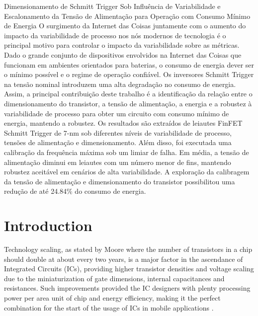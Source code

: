 \documentclass[pgmicro,mestrado,english]{iiufrgs}
\begin{document}
\begin{englishabstract}
{
Dimensionamento de Schmitt Trigger Sob Influência de Variabilidade e Escalonamento da Tensão de Alimentação para Operação com Consumo Mínimo de Energia
}
{
O surgimento da Internet das Coisas juntamente com o aumento do impacto da variabilidade de processo nos nós modernos de tecnologia é o principal motivo para controlar o impacto da variabilidade sobre as métricas. Dado o grande conjunto de dispositivos envolvidos na Internet das Coisas que funcionam em ambientes orientados para baterias, o consumo de energia dever ser o mínimo possível e o regime de operação confiável. Os inversores Schmitt Trigger na tensão nominal introduzem uma alta degradação no consumo de energia. Assim, a principal contribuição deste trabalho é a identificação da relação entre o dimensionamento do transistor, a tensão de alimentação, a energia e a robustez à variabilidade de processo para obter um circuito com consumo mínimo de energia, mantendo a robustez. Os resultados são extraídos de leiautes FinFET Schmitt Trigger de 7-nm sob diferentes níveis de variabilidade de processo, tensões de alimentação e dimensionamento. Além disso, foi executada uma calibração da frequência máxima sob um limiar de falha. Em média, a tensão de alimentação diminui em leiautes com um número menor de fins, mantendo robustez aceitável em cenários de alta variabilidade. A exploração da calibragem da tensão de alimentação e dimensionamento do transistor possibilitou uma redução de até 24.84\% do consumo de energia.
}
\end{englishabstract}

\tableofcontents

\chapter{Introduction}

	
	Technology scaling, as stated by Moore where the number of transistors in a chip should double at about every two years, is a major factor in the ascendance of Integrated Circuits (ICs), providing higher transistor densities and voltage scaling due to the miniaturization of gate dimensions, internal capacitances and resistances. Such improvements provided the IC designers with plenty processing power per area unit of chip and energy efficiency, making it the perfect combination for the start of the usage of ICs in mobile applications \cite{islam:10}. 
\end{document}
